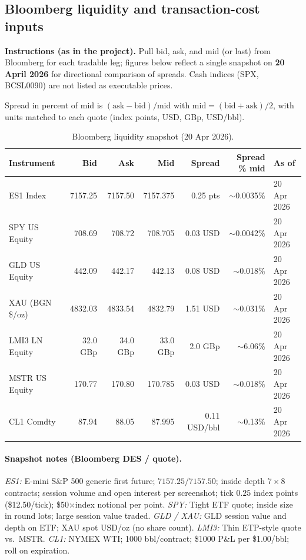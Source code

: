 \subsection{Bloomberg liquidity and transaction-cost inputs}
\label{subsec:bloomberg-liquidity}

\textbf{Instructions (as in the project).} Pull bid, ask, and mid (or last) from Bloomberg for each tradable leg; figures below reflect a single snapshot on \textbf{20 April 2026} for directional comparison of spreads. Cash indices (SPX, BCSL0090) are not listed as executable prices.

Spread in percent of mid is $(\mathrm{ask}-\mathrm{bid})/\mathrm{mid}$ with $\mathrm{mid}=(\mathrm{bid}+\mathrm{ask})/2$, with units matched to each quote (index points, USD, GBp, USD/bbl).

\begin{table}[htbp]
  \centering
  \caption{Bloomberg liquidity snapshot (20 Apr 2026).}
  \label{tab:liquidity}
  \footnotesize
  \begin{tabular}{@{}l r r r r r l@{}}
    \toprule
    \textbf{Instrument} & \textbf{Bid} & \textbf{Ask} & \textbf{Mid} & \textbf{Spread} & \textbf{Spread \% mid} & \textbf{As of} \\
    \midrule
    ES1 Index      & 7157.25 & 7157.50 & 7157.375 & 0.25 pts   & $\sim$0.0035\% & 20 Apr 2026 \\
    SPY US Equity  & 708.69  & 708.72  & 708.705  & 0.03 USD   & $\sim$0.0042\% & 20 Apr 2026 \\
    GLD US Equity  & 442.09  & 442.17  & 442.13   & 0.08 USD   & $\sim$0.018\%  & 20 Apr 2026 \\
    XAU (BGN \$/oz) & 4832.03 & 4833.54 & 4832.79  & 1.51 USD   & $\sim$0.031\%  & 20 Apr 2026 \\
    LMI3 LN Equity & 32.0 GBp & 34.0 GBp & 33.0 GBp & 2.0 GBp & $\sim$6.06\%   & 20 Apr 2026 \\
    MSTR US Equity & 170.77  & 170.80  & 170.785  & 0.03 USD   & $\sim$0.018\%  & 20 Apr 2026 \\
    CL1 Comdty     & 87.94   & 88.05   & 87.995   & 0.11 USD/bbl & $\sim$0.13\% & 20 Apr 2026 \\
    \bottomrule
  \end{tabular}
\end{table}

\paragraph{Snapshot notes (Bloomberg DES / quote).}
\textit{ES1:} E-mini S\&P 500 generic first future; $7157.25/7157.50$; inside depth $7\times8$ contracts; session volume and open interest per screenshot; tick $0.25$ index points (\$12.50/tick); \$50$\times$index notional per point.
\textit{SPY:} Tight ETF quote; inside size in round lots; large session value traded.
\textit{GLD / XAU:} GLD session value and depth on ETF; XAU spot USD/oz (no share count).
\textit{LMI3:} Thin ETP-style quote vs.\ MSTR.
\textit{CL1:} NYMEX WTI; 1000 bbl/contract; \$1000 P\&L per \$1.00/bbl; roll on expiration.

